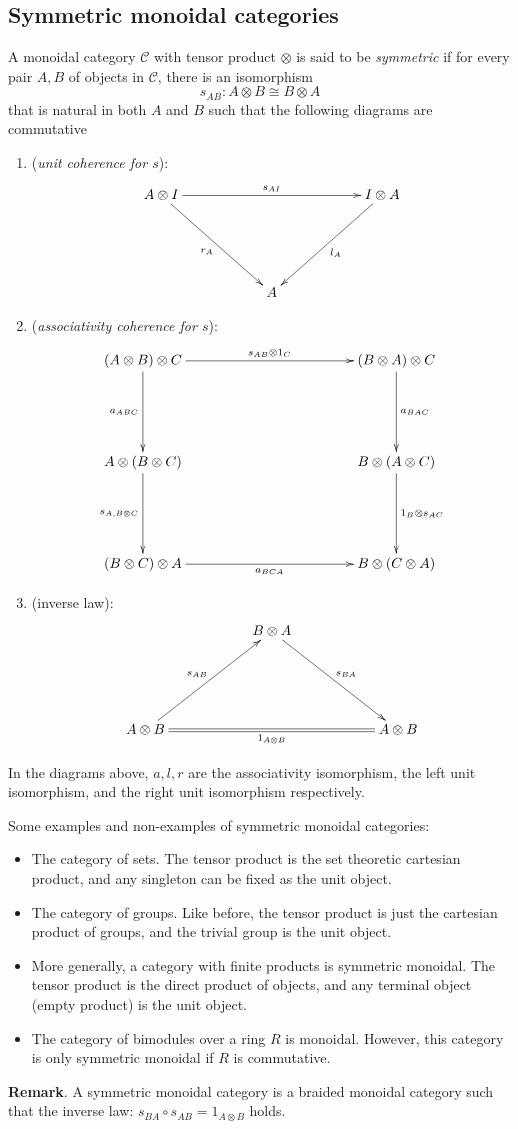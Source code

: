 \documentclass[10pt]{article}
\theoremstyle{plain}
\theoremstyle{definition}
\theoremstyle{remark}
\begin{document}
\subsection{Symmetric monoidal categories}
A monoidal category $\mathcal{C}$ with tensor product $\otimes$ is said to be \emph{symmetric} if for every pair $A,B$ of objects in $\mathcal{C}$, there is an isomorphism $$s_{AB}:A\otimes B\cong B\otimes A$$ that is natural in both $A$ and $B$ such that the following diagrams are commutative
\begin{enumerate}
\item (\emph{unit coherence for $s$}):
$$\xymatrix@+=2cm{A\otimes I \ar[rr]^{s_{AI}} \ar[dr]_{r_A} & & I\otimes A \ar[dl]^{l_A} \\ & A &}$$
\item (\emph{associativity coherence for $s$}):
$$\xymatrix@+=2cm{ (A\otimes B)\otimes C \ar[rr]^{s_{AB}\otimes 1_C} \ar[d]_{a_{ABC}} & & (B\otimes A)\otimes C \ar[d]^{a_{BAC}} \\ A\otimes (B\otimes C) \ar[d]_{s_{A,B\otimes C}} & & B\otimes (A\otimes C) \ar[d]^{1_B\otimes s_{AC}} \\ (B\otimes C)\otimes A \ar[rr]_{a_{BCA}} & & B\otimes(C\otimes A)
}$$
\item (inverse law):
$$\xymatrix@+=2cm{& B\otimes A \ar[dr]^{s_{BA}} & \\ A\otimes B \ar[ur]^{s_{AB}} \ar@{=}[rr]_{1_{A\otimes B}} && A\otimes B }$$
\end{enumerate}
In the diagrams above, $a,l,r$ are the associativity isomorphism, the left unit isomorphism, and the right unit isomorphism respectively.

Some examples and non-examples of symmetric monoidal categories:
\begin{itemize}
\item The category of sets.  The tensor product is the set theoretic cartesian product, and any singleton can be fixed as the unit object.
\item The category of groups.  Like before, the tensor product is just the cartesian product of groups, and the trivial group is the unit object.
\item More generally, a category with finite products is symmetric monoidal.  The tensor product is the direct product of objects, and any terminal object (empty product) is the unit object.
\item The category of bimodules over a ring $R$ is monoidal.  However, this category is only symmetric monoidal if $R$ is commutative.
\end{itemize}

\textbf{Remark}.  A symmetric monoidal category is a braided monoidal category such that the inverse law: $s_{BA}\circ s_{AB}=1_{A\otimes B}$ holds.


\end{document}
